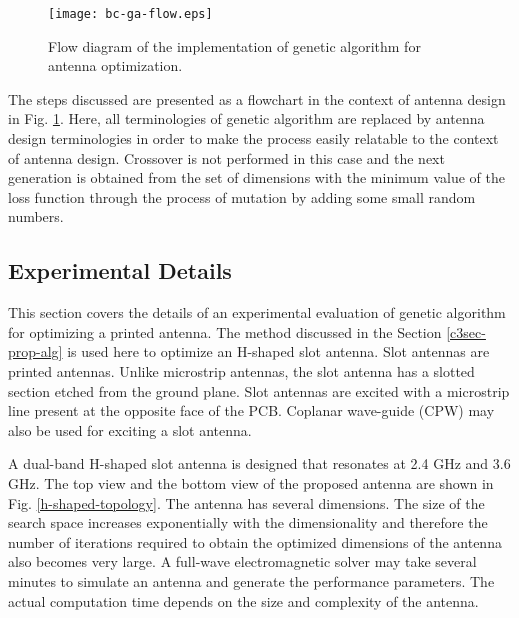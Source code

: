 \begin{figure}[h]
\centering
\texttt{[image: bc-ga-flow.eps]}
\caption{Flow diagram of the implementation of genetic algorithm for antenna optimization.}\label{ga-flow}
\end{figure}

The steps discussed are presented as a flowchart in the context of antenna design in Fig. \ref{ga-flow}. Here, all terminologies of genetic algorithm are replaced by antenna design terminologies in order to make the process easily relatable to the context of antenna design. Crossover is not performed in this case and the next generation is obtained from the set of dimensions with the minimum value of the loss function through the process of mutation by adding some small random numbers.

\subsection{Experimental Details} %
This section covers the details of an experimental evaluation of genetic algorithm for optimizing a printed antenna. The method discussed in the Section \ref{c3sec-prop-alg} is used here to optimize an H-shaped slot antenna. Slot antennas are printed antennas. Unlike microstrip antennas, the slot antenna has a slotted section etched from the ground plane. Slot antennas are excited with a microstrip line present at the opposite face of the PCB. Coplanar wave-guide (CPW) may also be used for exciting a slot antenna.

A dual-band H-shaped slot antenna is designed that resonates at 2.4 GHz and 3.6 GHz. The top view and the bottom view of the proposed antenna are shown in Fig. \ref{h-shaped-topology}. The antenna has several dimensions. The size of the search space increases exponentially with the dimensionality and therefore the number of iterations required to obtain the optimized dimensions of the antenna also becomes very large. A full-wave electromagnetic solver may take several minutes to simulate an antenna and generate the performance parameters. The actual computation time depends on the size and complexity of the antenna.

